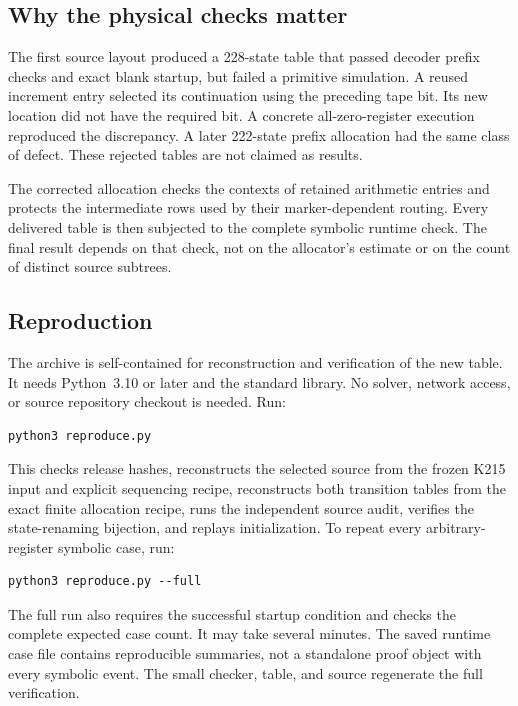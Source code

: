 \documentclass[11pt]{article}
\theoremstyle{definition}\newtheorem{definition}[theorem]{Definition}
\begin{document}
\subsection{Why the physical checks matter}

The first source layout produced a 228-state table that passed decoder
prefix checks and exact blank startup, but failed a primitive simulation.
A reused increment entry selected its continuation using the preceding
tape bit. Its new location did not have the required bit. A concrete
all-zero-register execution reproduced the discrepancy. A later 222-state
prefix allocation had the same class of defect. These rejected tables
are not claimed as results.

The corrected allocation checks the contexts of retained arithmetic
entries and protects the intermediate rows used by their marker-dependent
routing. Every delivered table is then subjected to the complete
symbolic runtime check. The final result depends on that check, not on
the allocator's estimate or on the count of distinct source subtrees.


\subsection{Reproduction}

The archive is self-contained for reconstruction and verification of the
new table. It needs Python~3.10 or later and the standard library. No
solver, network access, or source repository checkout is needed. Run:
\begin{lstlisting}
python3 reproduce.py
\end{lstlisting}
This checks release hashes, reconstructs the selected source from the
frozen K215 input and explicit sequencing recipe, reconstructs both
transition tables from the exact finite allocation recipe, runs the
independent source audit, verifies the state-renaming bijection, and
replays initialization. To repeat every arbitrary-register symbolic case,
run:
\begin{lstlisting}
python3 reproduce.py --full
\end{lstlisting}
The full run also requires the successful startup condition and checks
the complete expected case count. It may take several minutes.
The saved runtime case file contains reproducible summaries, not a
standalone proof object with every symbolic event. The small checker,
table, and source regenerate the full verification.
\end{document}
